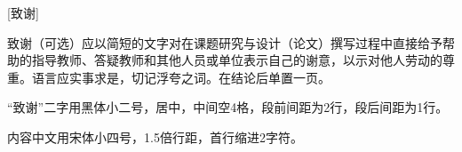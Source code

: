 %

[致谢]

致谢（可选）应以简短的文字对在课题研究与设计（论文）撰写过程中直接给予帮助的指导教师、答疑教师和其他人员或单位表示自己的谢意，以示对他人劳动的尊重。语言应实事求是，切记浮夸之词。在结论后单置一页。

“致谢”二字用黑体小二号，居中，中间空4格，段前间距为2行，段后间距为1行。

内容中文用宋体小四号，1.5倍行距，首行缩进2字符。
